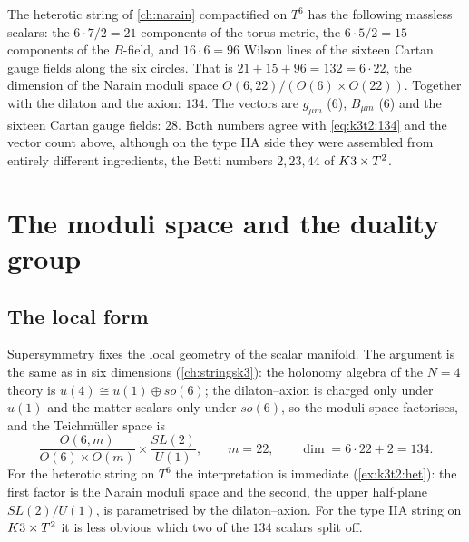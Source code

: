 \begin{example}\label{ex:k3t2:het}
The heterotic string of \cref{ch:narain} compactified on $T^6$ has the following massless
scalars: the $6\cdot7/2=21$ components of the torus metric, the $6\cdot5/2=15$ components of
the $B$-field, and $16\cdot 6=96$ Wilson lines of the sixteen Cartan gauge fields along the
six circles. That is $21+15+96=132=6\cdot 22$, the dimension of the Narain moduli space
$O(6,22)/(O(6)\times O(22))$. Together with the dilaton and the axion: $134$. The vectors are
$g_{\mu m}$ ($6$), $B_{\mu m}$ ($6$) and the sixteen Cartan gauge fields: $28$. Both numbers
agree with \eqref{eq:k3t2:134} and the vector count above, although on the type IIA side they
were assembled from entirely different ingredients, the Betti numbers $2,23,44$ of $K3\times T^2$.
\end{example}

\section{The moduli space and the duality group}\label{sec:k3t2:moduli}

\subsection{The local form}
Supersymmetry fixes the local geometry of the scalar manifold. The argument is the same as in
six dimensions (\cref{ch:stringsk3}): the holonomy algebra of the $N=4$ theory is
$u(4)\cong u(1)\oplus so(6)$; the dilaton--axion is charged only under $u(1)$ and the matter
scalars only under $so(6)$, so the moduli space factorises, and the Teichm\"uller space is
\begin{equation}\label{eq:k3t2:local}
 \frac{O(6,m)}{O(6)\times O(m)}\times\frac{SL(2)}{U(1)},\qquad m=22,\qquad
 \dim = 6\cdot22+2=134 .
\end{equation}
For the heterotic string on $T^6$ the interpretation is immediate
(\cref{ex:k3t2:het}): the first factor is the Narain moduli space and the second, the upper
half-plane $SL(2)/U(1)$, is parametrised by the dilaton--axion. For the type IIA string on
$K3\times T^2$ it is less obvious which two of the $134$ scalars split off.

